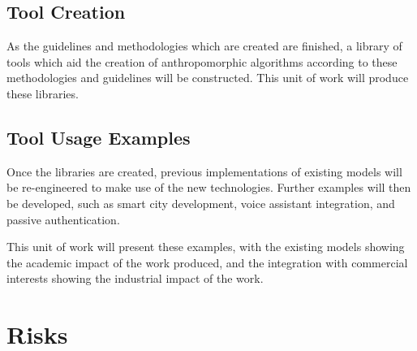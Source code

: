 \subsection{Tool Creation}
As the guidelines and methodologies which are created are finished, a library of tools which aid the creation of anthropomorphic algorithms according to these methodologies and guidelines will be constructed. This unit of work will produce these libraries.\par

\subsection{Tool Usage Examples}
Once the libraries are created, previous implementations of existing models will be re-engineered to make use of the new technologies. Further examples will then be developed, such as smart city development, voice assistant integration, and passive authentication.\par

This unit of work will present these examples, with the existing models showing the academic impact of the work produced, and the integration with commercial interests showing the industrial impact of the work.\par








\section{Risks}
\label{sec:risks}


